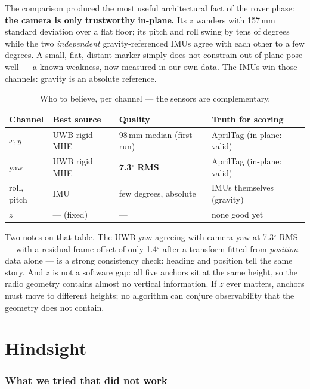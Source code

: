 \documentclass[11pt,a4paper]{article}
\begin{document}
The comparison produced the most useful architectural fact of the rover phase:
\textbf{the camera is only trustworthy in-plane.} Its $z$ wanders with 157\,mm
standard deviation over a flat floor; its pitch and roll swing by tens of degrees
while the two \emph{independent} gravity-referenced IMUs agree with each other to
a few degrees. A small, flat, distant marker simply does not constrain
out-of-plane pose well --- a known weakness, now measured in our own data. The
IMUs win those channels: gravity is an absolute reference.

\begin{table}[h]
\centering
\caption{Who to believe, per channel --- the sensors are complementary.}
\begin{tabular}{@{}llll@{}}
\toprule
\textbf{Channel} & \textbf{Best source} & \textbf{Quality} & \textbf{Truth for scoring}\\
\midrule
$x, y$      & UWB rigid MHE & 98\,mm median (first run) & AprilTag (in-plane: valid)\\
yaw         & UWB rigid MHE & \textbf{7.3$^\circ$ RMS}  & AprilTag (in-plane: valid)\\
roll, pitch & IMU           & few degrees, absolute     & IMUs themselves (gravity)\\
$z$         & --- (fixed)   & ---                       & none good yet\\
\bottomrule
\end{tabular}
\end{table}

Two notes on that table. The UWB yaw agreeing with camera yaw at 7.3$^\circ$ RMS
--- with a residual frame offset of only 1.4$^\circ$ after a transform fitted from
\emph{position} data alone --- is a strong consistency check: heading and position
tell the same story. And $z$ is not a software gap: all five anchors sit at the
same height, so the radio geometry contains almost no vertical information. If $z$
ever matters, anchors must move to different heights; no algorithm can conjure
observability that the geometry does not contain.

\part{Hindsight}

\section{What we tried that did not work}
\label{sec:failures}
\end{document}
